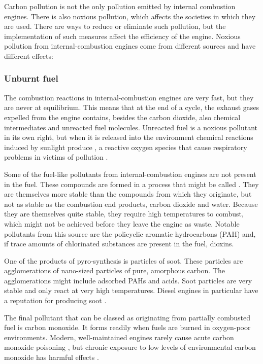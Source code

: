 Carbon pollution is not the only pollution emitted by internal combustion
engines. There is also noxious pollution, which affects the societies in which
they are used. There are ways to reduce or eliminate such pollution, but the
implementation of such measures affect the efficiency of the engine. Noxious
pollution from internal\hyp{}combustion engines come from different sourc\-es
and have different effects:

\subsubsection{Unburnt fuel}

The combustion reactions in internal\hyp{}combustion engines are very fast, but
they are never at equilibrium. This means that at the end of a cycle, the
exhaust gases expelled from the engine contains, besides the carbon dioxide,
also chemical intermediates and unreacted fuel molecules. Unreacted fuel is a
noxious pollutant in its own right, but when it is released into the environment
chemical reactions induced by sunlight produce , a reactive
oxygen species that cause respiratory problems in victims of pollution
\autocite{Davidson1998}.

Some of the fuel-like pollutants from internal\hyp{}combustion engines are not
present in the fuel. These compounds are formed in a process that might be
called . They are themselves more stable than the
compounds from which they originate, but not as stable as the combustion end
products, carbon dioxide and water. Because they are themselves quite stable,
they require high temperatures to combust, which might not be achieved before
they leave the engine as waste. Notable pollutants from this source are the
policyclic aromatic hydrocarbons (PAH) and, if trace amounts of chlorinated
substances are present in the fuel, dioxins.

One of the products of pyro-synthesis is particles of soot. These particles are
agglomerations of nano-sized particles of pure, amorphous carbon. The
agglomerations might include adsorbed PAHs and acids. Soot particles are very
stable and only react at very high temperatures. Diesel engines in particular
have a reputation for producing soot \autocite{Mohankumar2017}.

The final pollutant that can be classed as originating from partially combusted
fuel is carbon monoxide. It forms readily when fuels are burned in oxygen-poor
environments. Modern, well-maintained engines rarely cause acute carbon monoxide
poisoning \autocite{Reumuth2018}, but chronic exposure to low levels of
environmental carbon monoxide has harmful effects \autocite{Wright2002}.

